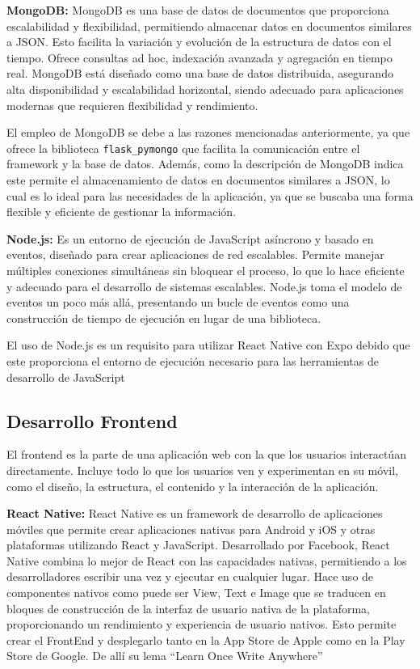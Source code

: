 \textbf{MongoDB:} MongoDB es una base de datos de documentos que proporciona escalabilidad y flexibilidad, permitiendo almacenar datos en documentos similares a JSON. Esto facilita la variación y evolución de la estructura de datos con el tiempo. Ofrece consultas ad hoc, indexación avanzada y agregación en tiempo real. MongoDB está diseñado como una base de datos distribuida, asegurando alta disponibilidad y escalabilidad horizontal, siendo adecuado para aplicaciones modernas que requieren flexibilidad y rendimiento. \cite{mongodb}

El empleo de MongoDB se debe a las razones mencionadas anteriormente, ya que ofrece la biblioteca \texttt{flask\_pymongo} que facilita la comunicación entre el framework y la base de datos. Además, como la descripción de MongoDB indica este permite el almacenamiento de datos en documentos similares a JSON, lo cual es lo ideal para las necesidades de la aplicación, ya que se buscaba una forma flexible y eficiente de gestionar la información. 

\textbf{Node.js:} Es un entorno de ejecución de JavaScript asíncrono y basado en eventos, diseñado para crear aplicaciones de red escalables. Permite manejar múltiples conexiones simultáneas sin bloquear el proceso, lo que lo hace eficiente y adecuado para el desarrollo de sistemas escalables. Node.js toma el modelo de eventos un poco más allá, presentando un bucle de eventos como una construcción de tiempo de ejecución en lugar de una biblioteca. \cite{nodejs}

El uso de Node.js es un requisito para utilizar React Native con Expo debido que este proporciona el entorno de ejecución necesario para las herramientas de desarrollo de JavaScript

\subsection{Desarrollo Frontend}

El frontend es la parte de una aplicación web con la que los usuarios interactúan directamente. Incluye todo lo que los usuarios ven y experimentan en su móvil, como el diseño, la estructura, el contenido y la interacción de la aplicación.

\textbf{React Native:} React Native es un framework de desarrollo de aplicaciones móviles que permite crear aplicaciones nativas para Android y iOS y otras plataformas utilizando React y JavaScript. Desarrollado por Facebook, React Native combina lo mejor de React con las capacidades nativas, permitiendo a los desarrolladores escribir una vez y ejecutar en cualquier lugar. Hace uso de componentes nativos como puede ser View, Text e Image que se traducen en bloques de construcción de la interfaz de usuario nativa de la plataforma, proporcionando un rendimiento y experiencia de usuario nativos. Esto permite crear el FrontEnd y desplegarlo tanto en la App Store de Apple como en la Play Store de Google. De allí su lema “Learn Once Write Anywhere” \cite{react_native}


